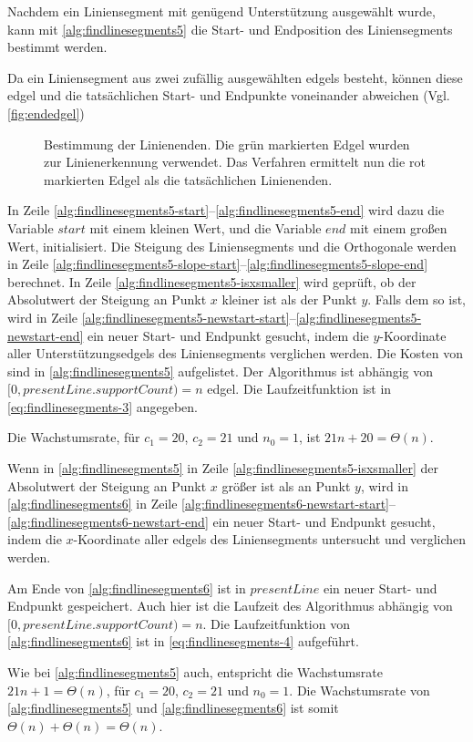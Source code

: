 Nachdem ein Liniensegment mit genügend Unterstützung ausgewählt wurde, kann mit \autoref{alg:findlinesegments5} die
 Start- und Endposition des Liniensegments bestimmt werden.

Da ein Liniensegment aus zwei zufällig ausgewählten \glspl{edgel} besteht, können diese \gls{edgel} und die
 tatsächlichen Start- und Endpunkte voneinander abweichen (Vgl. \autoref{fig:endedgel})
\begin{figure}[!ht]
	\centering
	
	\caption{Bestimmung der Linienenden. Die grün markierten Edgel wurden zur Linienerkennung verwendet.
	 Das Verfahren ermittelt nun die rot markierten Edgel als die tatsächlichen Linienenden.}
	\label{fig:endedgel}
\end{figure}
In Zeile
 \ref{alg:findlinesegments5-start}--\ref{alg:findlinesegments5-end} wird dazu die Variable $\mathit{start}$ mit einem
 kleinen Wert, und die Variable $\mathit{end}$ mit einem großen Wert, initialisiert. Die Steigung des Liniensegments
 und die Orthogonale werden in Zeile \ref{alg:findlinesegments5-slope-start}--\ref{alg:findlinesegments5-slope-end}
 berechnet. In Zeile \ref{alg:findlinesegments5-isxsmaller} wird geprüft, ob der Absolutwert der Steigung an Punkt $x$
 kleiner ist als der Punkt $y$. Falls dem so ist, wird in Zeile
 \ref{alg:findlinesegments5-newstart-start}--\ref{alg:findlinesegments5-newstart-end} ein neuer Start- und Endpunkt
 gesucht, indem die $y$-Koordinate aller Unterstützungsedgels des Liniensegments verglichen werden. Die Kosten von
  sind in \autoref{alg:findlinesegments5} aufgelistet. Der Algorithmus ist abhängig von
 $[0,\mathit{presentLine.supportCount}) = n$ \gls{edgel}. Die Laufzeitfunktion ist in \autoref{eq:findlinesegments-3}
 angegeben.

Die Wachstumsrate, für $c_{1} = 20$, $c_{2} = 21$ und $n_{0} = 1$, ist $21n + 20 = \Theta(n)$.

Wenn in \autoref{alg:findlinesegments5} in Zeile \ref{alg:findlinesegments5-isxsmaller} der Absolutwert der Steigung an
 Punkt $x$ größer ist als an Punkt $y$, wird in \autoref{alg:findlinesegments6} in Zeile
 \ref{alg:findlinesegments6-newstart-start}--\ref{alg:findlinesegments6-newstart-end} ein neuer Start- und Endpunkt
 gesucht, indem die $x$-Koordinate aller \glspl{edgel} des Liniensegments untersucht und verglichen werden.

Am Ende von \autoref{alg:findlinesegments6} ist in $\mathit{presentLine}$ ein neuer Start- und Endpunkt gespeichert.
 Auch hier ist die Laufzeit des Algorithmus abhängig von $[0,\mathit{presentLine.supportCount}) = n$. Die
 Laufzeitfunktion von \autoref{alg:findlinesegments6} ist in \autoref{eq:findlinesegments-4} aufgeführt.

Wie bei \autoref{alg:findlinesegments5} auch, entspricht die Wachstumsrate $21n + 1 = \Theta(n)$, für
 $c_{1} = 20$, $c_{2} = 21$ und $n_{0} = 1$. Die Wachstumsrate von \autoref{alg:findlinesegments5} und
 \autoref{alg:findlinesegments6} ist somit $\Theta(n) + \Theta(n) = \Theta(n)$.

